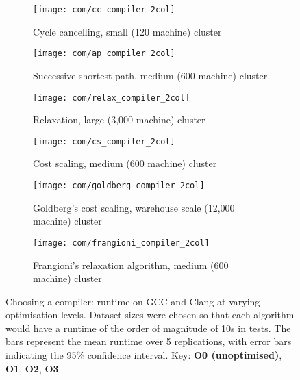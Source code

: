 \begin{figure}
    \begin{widepage}
    \begin{subfigure}[c]{0.5\textwidth}
        \texttt{[image: com/cc\_compiler\_2col]}
        \caption{Cycle cancelling, small (120 machine) cluster}
        \label{fig:compilers:cc}
    \end{subfigure}
    \begin{subfigure}[c]{0.5\textwidth}
        \texttt{[image: com/ap\_compiler\_2col]}
        \caption{Successive shortest path, medium (600 machine) cluster}
        \label{fig:compilers:ap}
    \end{subfigure}
    \begin{subfigure}[c]{0.5\textwidth}
        \texttt{[image: com/relax\_compiler\_2col]}
        \caption{Relaxation, large (3,000 machine) cluster}
        \label{fig:compilers:relax}
    \end{subfigure}
    \begin{subfigure}[c]{0.5\textwidth}
        \texttt{[image: com/cs\_compiler\_2col]}
        \caption{Cost scaling, medium (600 machine) cluster}
        \label{fig:compilers:cs}
    \end{subfigure}
    \begin{subfigure}[c]{0.5\textwidth}
        \texttt{[image: com/goldberg\_compiler\_2col]}
        \caption{Goldberg's cost scaling, warehouse scale (12,000 machine) cluster}
        \label{fig:compilers:goldberg}
    \end{subfigure}
    \begin{subfigure}[c]{0.5\textwidth}
        \texttt{[image: com/frangioni\_compiler\_2col]}
        \caption{Frangioni's relaxation algorithm, medium (600 machine) cluster}
        \label{fig:compilers:frangioni}
    \end{subfigure}
    \end{widepage}
    \caption[Choosing a compiler]{Choosing a compiler: runtime on GCC and Clang at varying optimisation levels. Dataset sizes were chosen so that each algorithm would have a runtime of the order of magnitude of 10s in tests. The bars represent the mean runtime over 5 replications, with error bars indicating the 95\% confidence interval. Key:  \textbf{\color{matplotlib_bar_r} O0 (unoptimised)}, \textbf{\color{matplotlib_bar_g} O1}, \textbf{\color{matplotlib_bar_b} O2}, \textbf{\color{matplotlib_bar_k} O3}.}
    \label{fig:compilers}
\end{figure}

